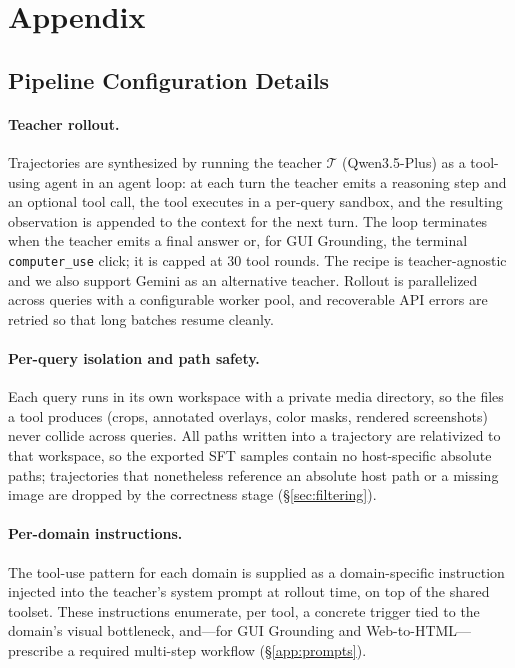 \section{Appendix}
\label{sec:appendix}

\subsection{Pipeline Configuration Details}
\label{app:pipeline}

\paragraph{Teacher rollout.}
Trajectories are synthesized by running the teacher $\mathcal{T}$ (Qwen3.5-Plus) as a tool-using agent in an agent loop: at each turn the teacher emits a reasoning step and an optional tool call, the tool executes in a per-query sandbox, and the resulting observation is appended to the context for the next turn. The loop terminates when the teacher emits a final answer or, for GUI Grounding, the terminal \texttt{computer\_use} click; it is capped at $30$ tool rounds. The recipe is teacher-agnostic and we also support Gemini as an alternative teacher. Rollout is parallelized across queries with a configurable worker pool, and recoverable API errors are retried so that long batches resume cleanly.

\paragraph{Per-query isolation and path safety.}
Each query runs in its own workspace with a private media directory, so the files a tool produces (crops, annotated overlays, color masks, rendered screenshots) never collide across queries. All paths written into a trajectory are relativized to that workspace, so the exported SFT samples contain no host-specific absolute paths; trajectories that nonetheless reference an absolute host path or a missing image are dropped by the correctness stage (\S\ref{sec:filtering}).

\paragraph{Per-domain instructions.}
The tool-use pattern for each domain is supplied as a domain-specific instruction injected into the teacher's system prompt at rollout time, on top of the shared toolset. These instructions enumerate, per tool, a concrete trigger tied to the domain's visual bottleneck, and---for GUI Grounding and Web-to-HTML---prescribe a required multi-step workflow (\S\ref{app:prompts}).

